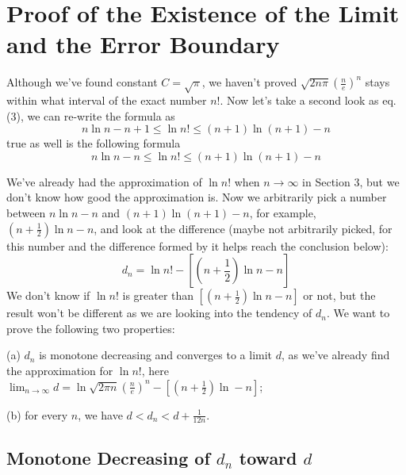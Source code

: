 \documentclass[11pt]{article}
\begin{document}
\section{\large Proof of the Existence of the Limit and the Error Boundary}

Although we've found constant $C = \sqrt{\pi}$,  we haven't proved $\displaystyle  \sqrt{2n \pi}  \left( \frac{n}{e} \right) ^n $ stays within what interval of the exact number $n!$.  Now let's take a second look as eq. (3),  we can re-write the formula as
$$ n \ln n - n + 1 \leqslant \ln n! \leqslant (n+1) \ln (n+1) - n $$
true as well is the following formula
$$  n \ln n - n  \leqslant \ln n! \leqslant (n+1) \ln (n+1) - n $$


We've already had the approximation of $\ln n!$ when $n \to \infty$ in Section 3,  but we don't know how good the approximation is.   Now we arbitrarily pick a number between $n \ln n - n$ and $(n+1) \ln (n+1) - n$,  for example,  $(n + \frac{1}{2}) \ln n - n$,  and look at the difference (maybe not arbitrarily picked,  for this number and the difference formed by it helps reach the conclusion below): 
$$ d_n = \ln n! - \left[(n + \frac{1}{2}) \ln n - n \right] $$
We don't know if $\ln n!$ is greater than $[(n + \frac{1}{2}) \ln n - n ] $ or not,  but the result won't be different as we are looking into the tendency of $d_n$.  We want to prove the following two properties:

(a) $d_n $ is monotone decreasing and converges to a limit $d$,  as we've already find the approximation for $\ln n!$,  here $\displaystyle \lim _{n \to \infty } d = \ln \sqrt{2 \pi n}  \left( \frac{n}{e} \right) ^n -\left[ \left(n + \frac{1}{2} \right) \ln - n \right] $;

(b) for every $n$,  we have $d < d_n < d + \frac{1}{12n}$.\\

\subsection{\normalsize Monotone Decreasing of $d_n$ toward $d$}
\end{document}

